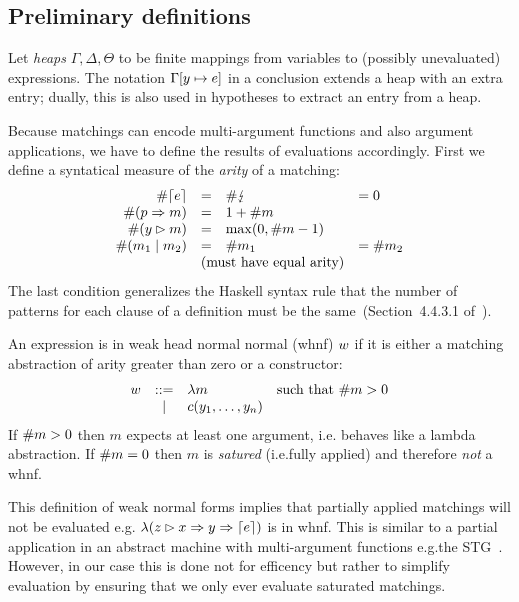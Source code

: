 \subsection{Preliminary definitions}

Let \emph{heaps} $\Gamma, \Delta, \Theta$ to be finite mappings from
variables to (possibly unevaluated) expressions.  The notation
$\Gamma[y \mapsto e]$ in a conclusion extends a heap with an extra
entry; dually, this is also used in hypotheses to extract an entry
from a heap.

Because matchings can encode multi-argument functions and also
argument applications, we have to define the results of evaluations
accordingly. First we define a syntatical measure  of the \emph{arity}
of a matching:
\[
  \begin{array}{rcll}
    \arity{\matchreturn{e}} &=&  \arity{\matchfail} &= 0\\
    \arity{(\matchpat{p}{m})} &=& 1 + \arity{m} \\
    \arity{(\matcharg{y}{m})} &=& \max(0, \arity{m} - 1) \\
     \arity{(\matchalt{m_1}{m_2})} &=& \arity{m_1} &= \arity{m_2} \\
                            & \multicolumn{2}{l}{\text{(must have equal arity)}}
  \end{array}
\]
The last condition generalizes the Haskell syntax rule that the number
of patterns for each clause of a definition must be the
same~(Section~4.4.3.1 of~\cite{haskell_2010_report}).

An expression is in weak head normal normal (whnf) $w$ if it is either
a matching abstraction of arity greater than zero or a constructor:
\[
\begin{array}{rcll}
  w  &::=&  \lambda m & \text{such that}~ \#{m}> 0 \\
     &|& c(y_1,\ldots,y_n)
\end{array}
\]
If $\#{m}>0$ then $m$ expects at least one argument, i.e.\@
behaves like a lambda abstraction.  If $\#{m}= 0$ then $m$ is
\emph{satured} (i.e.\@ fully applied) and therefore \emph{not} a whnf.

This definition of weak normal forms implies that partially applied
matchings will not be evaluated e.g.\@
$\lambda(z\rhd x \Rightarrow y \Rightarrow \left\lceil e\right\rceil)$
is in whnf. This is similar to a partial application in an abstract
machine with multi-argument functions e.g.\@ the
STG~\cite{jones_1992}.  However, in our case this is done not for
efficency but rather to simplify evaluation by ensuring that we only
ever evaluate saturated matchings.

